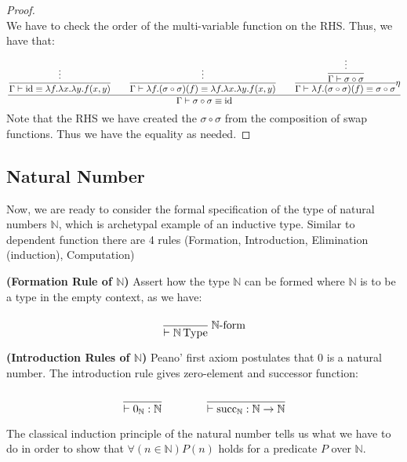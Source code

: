 \begin{proof}
\begin{equation*}
    \end{equation*}
    \todo We have to check the order of the multi-variable function on the RHS. Thus, we have that:
    \begin{equation*}
        \cfrac{\cfrac{\vdots}{\Gamma\vdash\operatorname{id}\equiv\lambda f.\lambda x.\lambda y.f(x, y)}\qquad\cfrac{\vdots}{\Gamma\vdash \lambda f.(\sigma\circ\sigma)(f)\equiv\lambda f.\lambda x.\lambda y.f(x, y)}\qquad\cfrac{\cfrac{\vdots}{\Gamma\vdash \sigma\circ\sigma}}{\Gamma\vdash \lambda f.(\sigma\circ\sigma)(f)\equiv \sigma\circ\sigma}\eta}{\Gamma\vdash\sigma\circ\sigma\equiv\operatorname{id}}
    \end{equation*}
    Note that the RHS we have created the $\sigma\circ\sigma$ from the composition of swap functions. Thus we have the equality as needed.
\end{proof}


\subsection{Natural Number}

Now, we are ready to consider the formal specification of the type of natural numbers $\mathbb{N}$, which is archetypal example of an inductive type. Similar to dependent function there are 4 rules (Formation, Introduction, Elimination (induction), Computation)

\begin{definition}{\textbf{(Formation Rule of $\mathbb{N}$)}}
    Assert how the type $\mathbb{N}$ can be formed where $\mathbb{N}$ is to be a type in the empty context, as we have:
    \begin{equation*}
        \cfrac{}{\vdash \mathbb{N}\type}\ \mathbb{N}\text{-form}
    \end{equation*}
\end{definition}

\begin{definition}{\textbf{(Introduction Rules of $\mathbb{N}$)}}
    Peano' first axiom postulates that $0$ is a natural number. The introduction rule gives zero-element and successor function:
    \begin{equation*}
        \cfrac{}{\vdash0_\mathbb{N}:\mathbb{N}} \qquad\qquad \cfrac{}{\vdash\operatorname{succ}_\mathbb{N}:\mathbb{N}\rightarrow\mathbb{N}}
    \end{equation*}
\end{definition}

The classical induction principle of the natural number tells us what we have to do in order to show that $\forall(n\in\mathbb{N})P(n)$ holds for a predicate $P$ over $\mathbb{N}$. 


